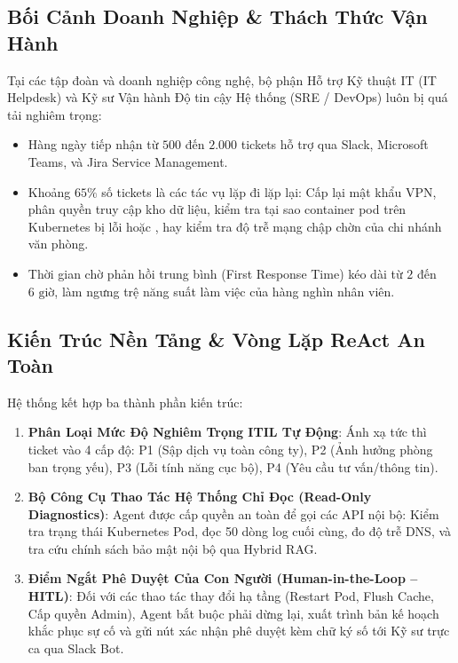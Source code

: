 \subsection{Bối Cảnh Doanh Nghiệp \& Thách Thức Vận Hành}
Tại các tập đoàn và doanh nghiệp công nghệ, bộ phận Hỗ trợ Kỹ thuật IT (IT Helpdesk) và Kỹ sư Vận hành Độ tin cậy Hệ thống (SRE / DevOps) luôn bị quá tải nghiêm trọng:
\begin{itemize}
  \item Hàng ngày tiếp nhận từ $500$ đến $2.000$ tickets hỗ trợ qua Slack, Microsoft Teams, và Jira Service Management.
  \item Khoảng $65\%$ số tickets là các tác vụ lặp đi lặp lại: Cấp lại mật khẩu VPN, phân quyền truy cập kho dữ liệu, kiểm tra tại sao container pod trên Kubernetes bị lỗi  hoặc , hay kiểm tra độ trễ mạng chập chờn của chi nhánh văn phòng.
  \item Thời gian chờ phản hồi trung bình (First Response Time) kéo dài từ $2$ đến $6\text{ giờ}$, làm ngưng trệ năng suất làm việc của hàng nghìn nhân viên.
\end{itemize}

\subsection{Kiến Trúc Nền Tảng \& Vòng Lặp ReAct An Toàn}
Hệ thống kết hợp ba thành phần kiến trúc:
\begin{enumerate}
  \item \textbf{Phân Loại Mức Độ Nghiêm Trọng ITIL Tự Động}: Ánh xạ tức thì ticket vào 4 cấp độ: P1 (Sập dịch vụ toàn công ty), P2 (Ảnh hưởng phòng ban trọng yếu), P3 (Lỗi tính năng cục bộ), P4 (Yêu cầu tư vấn/thông tin).
  \item \textbf{Bộ Công Cụ Thao Tác Hệ Thống Chỉ Đọc (Read-Only Diagnostics)}: Agent được cấp quyền an toàn để gọi các API nội bộ: Kiểm tra trạng thái Kubernetes Pod, đọc 50 dòng log cuối cùng, đo độ trễ DNS, và tra cứu chính sách bảo mật nội bộ qua Hybrid RAG.
  \item \textbf{Điểm Ngắt Phê Duyệt Của Con Người (Human-in-the-Loop -- HITL)}: Đối với các thao tác thay đổi hạ tầng (Restart Pod, Flush Cache, Cấp quyền Admin), Agent bắt buộc phải dừng lại, xuất trình bản kế hoạch khắc phục sự cố và gửi nút xác nhận phê duyệt kèm chữ ký số tới Kỹ sư trực ca qua Slack Bot.
\end{enumerate}

